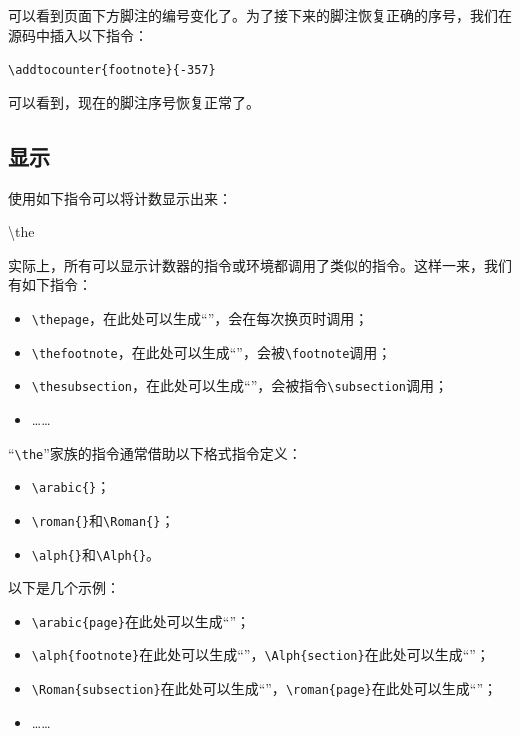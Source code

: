 \addtocounter{footnote}{357}
可以看到页面下方脚注的编号变化了。为了接下来的脚注恢复正确的序号，我们在源码中插入以下指令：

\begin{dmd}
  \verb|\addtocounter{footnote}{-357}|
\end{dmd}

\addtocounter{footnote}{-357}
可以看到，现在的脚注序号恢复正常了。

\subsection{显示}

使用如下指令可以将计数显示出来：

\begin{dmd}
\backslash the
\end{dmd}

实际上，所有可以显示计数器的指令或环境都调用了类似的指令。这样一来，我们有如下指令：

\begin{itemize}
  \item \verb|\thepage|，在此处可以生成``\thepage ''，会在每次换页时调用；
  \item \verb|\thefootnote|，在此处可以生成``\thefootnote ''，会被\verb|\footnote|调用；
  \item \verb|\thesubsection|，在此处可以生成``\thesubsection ''，会被指令\verb|\subsection|调用；
  \item ……
\end{itemize}

``\verb|\the|''家族的指令通常借助以下格式指令定义：

\begin{itemize}
  \item \verb|\arabic{|\verb|}|；
  \item \verb|\roman{|\verb|}|和\verb|\Roman{|\verb|}|；
  \item \verb|\alph{|\verb|}|和\verb|\Alph{|\verb|}|。
\end{itemize}

以下是几个示例：

\begin{itemize}
  \item \verb|\arabic{page}|在此处可以生成``''；
  \item \verb|\alph{footnote}|在此处可以生成``''，\verb|\Alph{section}|在此处可以生成``''；
  \item \verb|\Roman{subsection}|在此处可以生成``''，\verb|\roman{page}|在此处可以生成``''；
  \item ……
\end{itemize}

